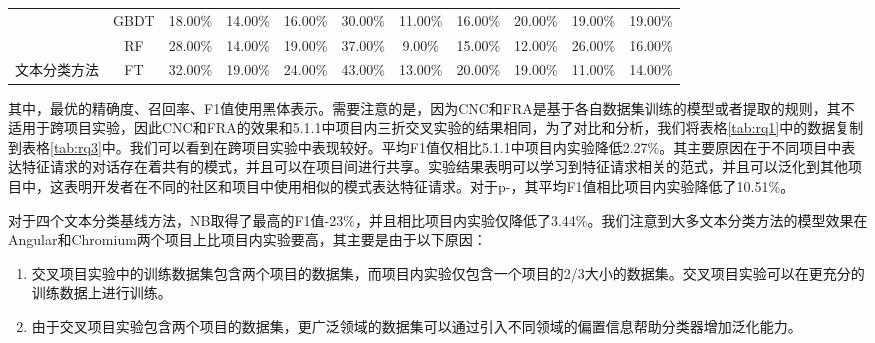 \begin{table}[!htbp]
\begin{tabular}{|c|c|c|c|c|c|c|c|c|c|c|}
                                      & GBDT                       & 18.00\%                        & 14.00\%                        & 16.00\%                        & 30.00\%                        & 11.00\%                        & 16.00\%                        & 20.00\%                        & 19.00\%                        & 19.00\%                        \\ \cline{2-11} 
                                      & RF                         & 28.00\%                        & 14.00\%                        & 19.00\%                        & 37.00\%                        & 9.00\%                         & 15.00\%                        & 12.00\%                        & 26.00\%                        & 16.00\%                        \\ \cline{2-11} 
\multirow{-4}{*}{文本分类方法} & FT                         & 32.00\%                        & 19.00\%                        & 24.00\%                        & 43.00\%                        & 13.00\%                        & 20.00\%                        & 19.00\%                        & 11.00\%                        & 14.00\%                        \\ \hline
\end{tabular}
\end{table}

其中，最优的精确度、召回率、F1值使用黑体表示。需要注意的是，因为CNC和FRA是基于各自数据集训练的模型或者提取的规则，其不适用于跨项目实验，因此CNC和FRA的效果和5.1.1中项目内三折交叉实验的结果相同，为了对比和分析，我们将表格\ref{tab:rq1}中的数据复制到表格\ref{tab:rq3}中。我们可以看到{\tool}在跨项目实验中表现较好。平均F1值仅相比5.1.1中项目内实验降低2.27\%。其主要原因在于不同项目中表达特征请求的对话存在着共有的模式，并且可以在项目间进行共享。实验结果表明{\tool}可以学习到特征请求相关的范式，并且可以泛化到其他项目中，这表明开发者在不同的社区和项目中使用相似的模式表达特征请求。对于p-{\tool}，其平均F1值相比项目内实验降低了10.51\%。

对于四个文本分类基线方法，NB取得了最高的F1值-23\%，并且相比项目内实验仅降低了3.44\%。我们注意到大多文本分类方法的模型效果在Angular和Chromium两个项目上比项目内实验要高，其主要是由于以下原因：
\begin{enumerate}
    \item 交叉项目实验中的训练数据集包含两个项目的数据集，而项目内实验仅包含一个项目的2/3大小的数据集。交叉项目实验可以在更充分的训练数据上进行训练。
    \item 由于交叉项目实验包含两个项目的数据集，更广泛领域的数据集可以通过引入不同领域的偏置信息帮助分类器增加泛化能力。
\end{enumerate}

